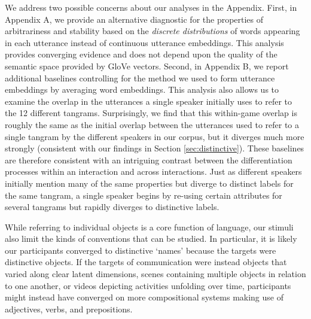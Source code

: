 \documentclass[alpha-refs]{wiley-article}
\begin{document}
We address two possible concerns about our analyses in the Appendix.
First, in Appendix A, we provide an alternative diagnostic for the properties of arbitrariness and stability based on the \emph{discrete distributions} of words appearing in each utterance instead of continuous utterance embeddings.
This analysis provides converging evidence and does not depend upon the quality of the semantic space provided by GloVe vectors.
Second, in Appendix B, we report additional baselines controlling for the method we used to form utterance embeddings by averaging word embeddings.
This analysis also allows us to examine the overlap in the utterances a single speaker initially uses to refer to the 12 different tangrams.
Surprisingly, we find that this within-game overlap is roughly the same as the initial overlap between the utterances used to refer to a single tangram by the different speakers in our corpus, but it diverges much more strongly (consistent with our findings in Section \ref{sec:distinctive}).
These baselines are therefore consistent with an intriguing contrast between the differentiation processes within an interaction and across interactions.
Just as different speakers initially mention many of the same properties but diverge to distinct labels for the same tangram, a single speaker begins by re-using certain attributes for several tangrams but rapidly diverges to distinctive labels.



While referring to individual objects is a core function of language, our stimuli also limit the kinds of conventions that can be studied. 
In particular, it is likely our participants converged to distinctive `names' because the targets were distinctive objects.
If the targets of communication were instead objects that varied along clear latent dimensions, scenes containing multiple objects in relation to one another, or videos depicting activities unfolding over time, participants might instead have converged on more compositional systems making use of adjectives, verbs, and prepositions.
\end{document}
